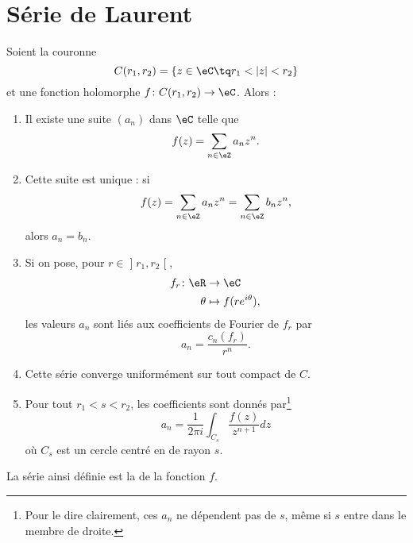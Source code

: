 \section{Série de Laurent}

\begin{theorem}       \label{THOooMKJOooVghZyG}
    Soient la couronne
    \begin{equation}
        C(r_1,r_2)=\{ z\in \eC\tq r_1<| z |<r_2 \}
    \end{equation}
    et une fonction holomorphe \( f\colon C(r_1,r_2)\to \eC\). Alors : 
    \begin{enumerate}
        \item
    Il existe une suite \( (a_n) \) dans \( \eC\) telle que
    \begin{equation}
        f(z)=\sum_{n\in \eZ}a_nz^n.
    \end{equation}
\item       \label{ITEMooUOPHooSJRGKs}
    Cette suite est unique : si 
    \begin{equation}
        f(z)=\sum_{n\in \eZ}a_nz^n=\sum_{n\in \eZ}b_nz^n,
    \end{equation}
    alors \( a_n=b_n\).
\item       \label{ITEMooDGGZooJkDSxC}
Si on pose, pour \( r\in \mathopen] r_1 , r_2 \mathclose[\),
    \begin{equation}
        \begin{aligned}
            f_r\colon \eR &\to \eC \\
            \theta&\mapsto f(r e^{i\theta}), 
        \end{aligned}
    \end{equation}
    les valeurs \( a_n\) sont liés aux coefficients de Fourier de \( f_r\) par
    \begin{equation}
        a_n=\frac{ c_n(f_r) }{ r^n }.
    \end{equation}
\item       \label{ITEMooOYCPooZZAyKs}
            Cette série converge uniformément sur tout compact de \( C\).
        \item
            Pour tout \( r_1<s<r_2\), les coefficients sont donnés par\footnote{Pour le dire clairement, ces \( a_n\) ne dépendent pas de \( s\), même si \( s\) entre dans le membre de droite.}
            \begin{equation}
                a_n=\frac{1}{ 2\pi i }\int_{C_s}\frac{ f(z) }{ z^{n+1} }dz
            \end{equation}
            où \( C_s\) est un cercle centré en de rayon \( s\). 
    \end{enumerate}
    La série ainsi définie est la  de la fonction \( f\).
\end{theorem}

